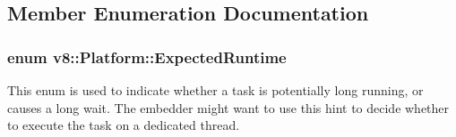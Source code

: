 \subsection{Member Enumeration Documentation}
\hypertarget{classv8_1_1Platform_ace7f666b2b5995bb0e898e12fa660718}{
\subsubsection[{Expected\-Runtime}]{\setlength{\rightskip}{0pt plus 5cm}enum {\bf v8\-::\-Platform\-::\-Expected\-Runtime}}}\label{classv8_1_1Platform_ace7f666b2b5995bb0e898e12fa660718}
This enum is used to indicate whether a task is potentially long running, or causes a long wait. The embedder might want to use this hint to decide whether to execute the task on a dedicated thread. 

